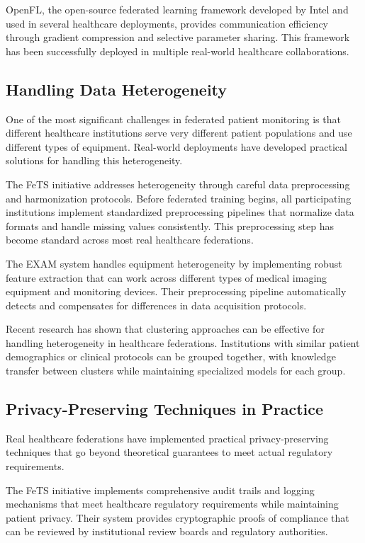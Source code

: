 \documentclass[3p,times,procedia]{elsarticle}
\begin{document}
OpenFL, the open-source federated learning framework developed by Intel and used in several healthcare deployments, provides communication efficiency through gradient compression and selective parameter sharing. This framework has been successfully deployed in multiple real-world healthcare collaborations.

\subsection{Handling Data Heterogeneity}
One of the most significant challenges in federated patient monitoring is that different healthcare institutions serve very different patient populations and use different types of equipment. Real-world deployments have developed practical solutions for handling this heterogeneity.

The FeTS initiative addresses heterogeneity through careful data preprocessing and harmonization protocols. Before federated training begins, all participating institutions implement standardized preprocessing pipelines that normalize data formats and handle missing values consistently. This preprocessing step has become standard across most real healthcare federations.

The EXAM system handles equipment heterogeneity by implementing robust feature extraction that can work across different types of medical imaging equipment and monitoring devices. Their preprocessing pipeline automatically detects and compensates for differences in data acquisition protocols.

Recent research has shown that clustering approaches can be effective for handling heterogeneity in healthcare federations. Institutions with similar patient demographics or clinical protocols can be grouped together, with knowledge transfer between clusters while maintaining specialized models for each group.

\subsection{Privacy-Preserving Techniques in Practice}

Real healthcare federations have implemented practical privacy-preserving techniques that go beyond theoretical guarantees to meet actual regulatory requirements.

The FeTS initiative implements comprehensive audit trails and logging mechanisms that meet healthcare regulatory requirements while maintaining patient privacy. Their system provides cryptographic proofs of compliance that can be reviewed by institutional review boards and regulatory authorities.
\end{document}
